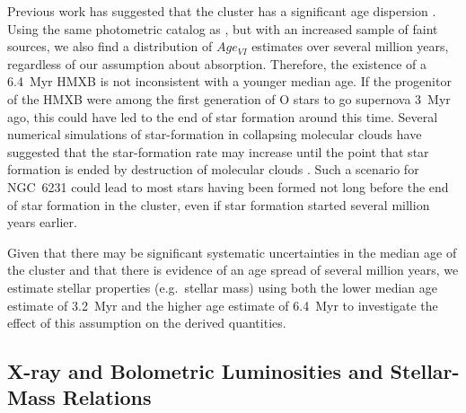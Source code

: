\documentclass[twocolumn,tighten]{aastex61}
\begin{document}
Previous work has suggested that the cluster has a significant age dispersion \citep{2013AJ....145...37S,2016arXiv160708860D}. Using the same photometric catalog as , but with an increased sample of faint sources, we also find a distribution of $Age_{VI}$ estimates over several million years, regardless of our assumption about absorption. Therefore, the existence of a 6.4~Myr HMXB is not inconsistent with a younger median age. If the progenitor of the HMXB were among the first generation of O stars to go supernova 3~Myr ago, this could have led to the end of star formation around this time. Several numerical simulations of star-formation in collapsing molecular clouds have suggested that the star-formation rate may increase until the point that star formation is ended by destruction of molecular clouds \citep[e.g.,][]{2012MNRAS.420.1457H}. Such a scenario for NGC~6231 could lead to most stars having been formed not long before the end of star formation in the cluster, even if star formation started several million years earlier.

Given that there may be significant systematic uncertainties in the median age of the cluster and that there is evidence of an age spread of several million years, we estimate stellar properties (e.g.\ stellar mass) using both the lower median age estimate of 3.2~Myr and the higher age estimate of 6.4~Myr to investigate the effect of this assumption on the derived quantities.

\subsection{X-ray and Bolometric Luminosities and Stellar-Mass Relations \label{xrayir.sec}}
\end{document}
